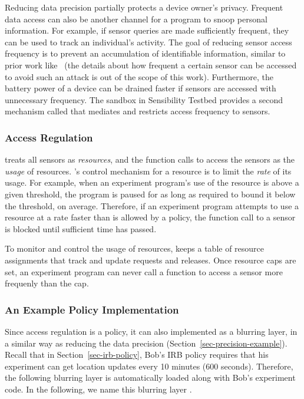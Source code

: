 Reducing data precision partially protects a device owner's privacy. Frequent data 
access can also be another channel for a program to snoop personal information.
For example, if sensor queries are made sufficiently frequent, they can be used
to track an individual's activity. The goal of reducing sensor access frequency 
is to prevent an accumulation of identifiable 
information, similar to prior work like~\cite{gruteser2003anonymous} (the 
details about how frequent a certain sensor can be accessed to avoid such an 
attack is out of the scope of this work). 
Furthermore, the battery power of a device can 
be drained faster if sensors are accessed
with unnecessary frequency. The sandbox in Sensibility Testbed provides a second mechanism
called  that mediates and restricts access frequency to sensors. 

\subsubsection{Access Regulation}

 treats all sensors as \textit{resources}, and the function calls to 
access the sensors as the \textit{usage} of resources. 's control 
mechanism for a resource is to limit the \textit{rate} of its usage. For example, 
when an 
experiment program's use of the resource is above a given threshold, the 
program is paused for as long as required to bound it below the
threshold, on average. Therefore, if an experiment program attempts to 
use a resource at a rate faster than is allowed by a policy, the function 
call to a sensor is blocked until sufficient time has passed. 

To monitor and control the usage of resources,  keeps a 
table of resource assignments that track and update requests and releases. 
Once resource caps are set, an experiment program can never call a 
function to access a sensor more frequenly than the cap. 

\subsubsection{An Example Policy Implementation}\label{sec-rate-example}

Since access regulation is a policy, it can also implemented as a blurring layer, 
in a similar way as reducing the data precision (Section~\ref{sec-precision-example}).
Recall that in Section~\ref{sec-irb-policy}, Bob's IRB policy requires that
his experiment can get location updates every 10 minutes (600 seconds). 
Therefore, the following blurring layer is automatically loaded along with 
Bob's experiment code. In the following, we name this blurring layer 
.

